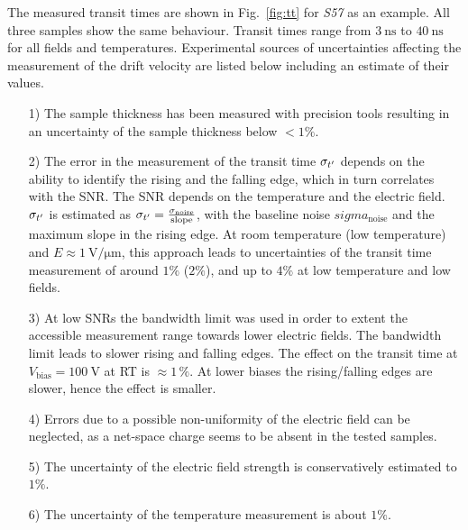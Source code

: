 The measured transit times are shown in Fig.~\ref{fig:tt} for \textit{S57} as an example. 
All three samples show the same behaviour. 
Transit times range from $\SI{3}{\nano\second}$ to $\SI{40}{\nano\second}$ for all fields and temperatures. 
Experimental sources of uncertainties affecting the measurement of the drift velocity are listed below including an estimate of their values.
\begin{itemize}
 \item[1)] The sample thickness has been measured with precision tools resulting in an uncertainty of the sample thickness below $<1\%$.
 \item[2)] The error in the measurement of the transit time $\sigma_{\mathnormal{t'}}$ depends on the ability to identify the rising and the falling edge, which in turn correlates with the SNR.
The SNR depends on the temperature and the electric field. 
$\sigma_{\mathnormal{t'}}$ is estimated as $\sigma_{\mathnormal{t'}} = \frac{\sigma_{\textrm{noise}}}{\textrm{slope}}$, with the baseline noise $sigma_{\textrm{noise}}$ and the maximum slope in the rising edge. 
At room temperature (low temperature) and $E\approx \SI{1}{\volt/\micro\meter}$, this approach leads to uncertainties of the transit time measurement of around $1\%$ ($2\%$),
 and up to $4\%$ at low temperature and low fields.
 \item[3)] At low SNRs the bandwidth limit was used in order to extent the accessible measurement range towards lower electric fields. 
The bandwidth limit leads to slower rising and falling edges. 
The effect on the transit time at $V_{\textrm{bias}} = \SI{100}{\volt}$ at RT is $\approx1\,\%$. 
At lower biases the rising/falling edges are slower, hence the effect is smaller. 
 \item[4)] Errors due to a possible non-uniformity of the electric field can be neglected, as a net-space charge seems to be absent in the tested samples.
 \item[5)] The uncertainty of the electric field strength is conservatively estimated to $1\%$.
 \item[6)] The uncertainty of the temperature measurement is about $1\%$. 
\end{itemize}




